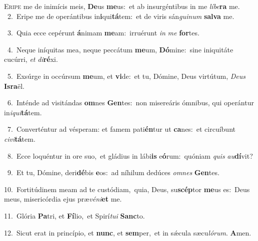 \lettrine{\initial\textcolor{\initialcolor}{E}}{ripe} me de inimícis meis, \textbf{De}\-us \textbf{me}\-us:~\star et ab insurgéntibus in me \textit{lí}\-\textit{be}\textbf{ra} me.\\
{\numbfont\textcolor{\numbcolor}{~2.}}~Eripe me de operántibus in\-\textbf{i}\-qui\-\textbf{tá}\-tem:~\star et de viris sán\-\textit{gui}\-\textit{num} \textbf{sal}\-\textbf{va} me.\par
{\numbfont\textcolor{\numbcolor}{~3.}}~Quia ecce cepérunt \textbf{á}\-nimam \textbf{me}\-am:~\star irruérunt \textit{in} \textit{me} \textbf{for}\-tes.\par
{\numbfont\textcolor{\numbcolor}{~4.}}~Neque iníquitas mea, neque peccátum \textbf{me}\-um, \textbf{Dó}\-mine:~\star sine iniquitáte cucúrri, \textit{et} \textit{di}\-\textbf{ré}xi.\par
{\numbfont\textcolor{\numbcolor}{~5.}}~Exsúrge in occúrsum \textbf{me}\-um, et \textbf{vi}\-de:~\star et tu, Dómine, Deus virtútum, \textit{De}\-\textit{us} \textbf{Is}\-\textbf{ra}ël.\par
{\numbfont\textcolor{\numbcolor}{~6.}}~Inténde ad visitándas \textbf{om}\-nes \textbf{Gen}\-tes:~\star non misereáris ómnibus, qui operántur in\-\textit{i}\-\textit{qui}\textbf{tá}tem.\par
{\numbfont\textcolor{\numbcolor}{~7.}}~Converténtur ad vésperam: et famem pati\-\textbf{én}\-tur ut \textbf{ca}\-nes:~\star et circuíbunt \textit{ci}\-\textit{vi}\textbf{tá}tem.\par
{\numbfont\textcolor{\numbcolor}{~8.}}~Ecce loquéntur in ore suo,~\dagger et gládius in lábi\textbf{is} e\-\textbf{ó}\-rum:~\star quóniam \textit{quis} \textit{au}\-\textbf{dí}vit?\par
{\numbfont\textcolor{\numbcolor}{~9.}}~Et tu, Dómine, deri\-\textbf{dé}\-bis \textbf{e}\-os:~\star ad níhilum dedúces \textit{om}\-\textit{nes} \textbf{Gen}\-tes.\par
{\numbfont\textcolor{\numbcolor}{10.}}~Fortitúdinem meam ad te custódiam,~\dagger quia, Deus, su\-\textbf{scép}\-tor \textbf{me}\-us es:~\star Deus meus, misericórdia ejus præ\-\textit{vé}\-\textit{ni}\textbf{et} me.\par
{\numbfont\textcolor{\numbcolor}{11.}}~Glória \textbf{Pa}\-tri, et \textbf{Fí}\-lio,~\star et Spirí\-\textit{tu}\-\textit{i} \textbf{Sanc}\-to.\par
{\numbfont\textcolor{\numbcolor}{12.}}~Sicut erat in princípio, et \textbf{nunc}\-, et \textbf{sem}\-per,~\star et in sǽcula sæcu\-\textit{ló}\-\textit{rum}. \textbf{A}\-men.\par
